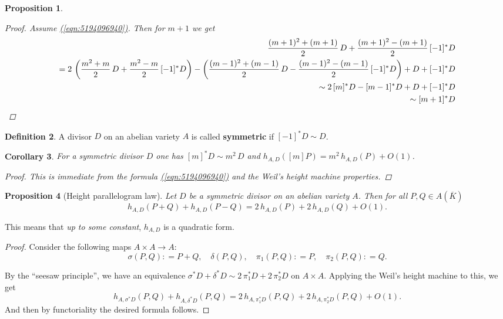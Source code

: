 \documentclass{article}
\newcommand{\eqnref}[1]{\hyperref[#1]{(\ref*{#1})}}
\newtheorem{proposition}{Proposition}[section]
\newtheorem{corollary}[proposition]{Corollary}
\theoremstyle{definition}
\newtheorem{definition}[proposition]{Definition}
\newcommand{\term}{\textbf}
\newcommand{\dfn}{\mathrel{\mathop:}=}
\begin{document}
\begin{proposition}
\begin{proof}
    Assume \eqnref{eqn:5194096940}. Then for $m+1$ we get
    {\small
      \begin{align*}
             \frac{(m+1)^2+(m+1)}{2}\,D + \frac{(m+1)^2-(m+1)}{2}\,[-1]^* D\\
             = 2\, \left(\frac{m^2+m}{2}\,D + \frac{m^2 - m}{2}\,[-1]^* D\right) - \left(\frac{(m-1)^2 + (m-1)}{2}\,D - \frac{(m-1)^2 - (m-1)}{2}\,[-1]^* D\right) + D +[-1]^* D \\
             \sim 2\,[m]^* D - [m-1]^* D + D + [-1]^* D \\
             \sim [m+1]^* D \qedhere
      \end{align*}}
  \end{proof}
\end{proposition}

\begin{definition}
  A divisor $D$ on an abelian variety $A$ is called \term{symmetric} if
  $[-1]^* D \sim D$.
\end{definition}

\begin{corollary}
  \label{corollary:symmetric-divisor}
  For a symmetric divisor $D$ one has $[m]^* D \sim m^2\,D$ and
  $h_{A,D} ([m] P) = m^2\,h_{A,D} (P) + O(1)$.

  \begin{proof}
    This is immediate from the formula \eqnref{eqn:5194096940} and the Weil's
    height machine properties.
  \end{proof}
\end{corollary}

\begin{proposition}[Height parallelogram law]
  \label{proposition:height-parallelogram-law}
  Let $D$ be a symmetric divisor on an abelian variety $A$. Then for all
  $P, Q \in A (\overline{K})$
  $$h_{A,D} (P+Q) + h_{A,D} (P-Q) = 2\,h_{A,D} (P) + 2\,h_{A,D} (Q) + O(1).$$
\end{proposition}

This means that \emph{up to some constant}, $h_{A,D}$ is a quadratic form.

\begin{proof}
  Consider the following maps $A\times A\to A$:
  $$\sigma (P,Q) \dfn P+Q, \quad \delta (P,Q), \quad \pi_1 (P,Q) \dfn P, \quad \pi_2 (P,Q) \dfn Q.$$

  By the ``seesaw principle'', we have an equivalence
  $\sigma^* D + \delta^* D \sim 2\,\pi_1^* D + 2\,\pi_2^* D$ on $A\times
  A$. Applying the Weil's height machine to this, we get
  $$h_{A,\sigma^* D} (P,Q) + h_{A,\delta^* D} (P,Q) = 2\,h_{A,\pi_1^* D} (P,Q) + 2\,h_{A,\pi_2^* D} (P,Q) + O (1).$$
  And then by functoriality the desired formula follows.
\end{proof}
\end{document}
